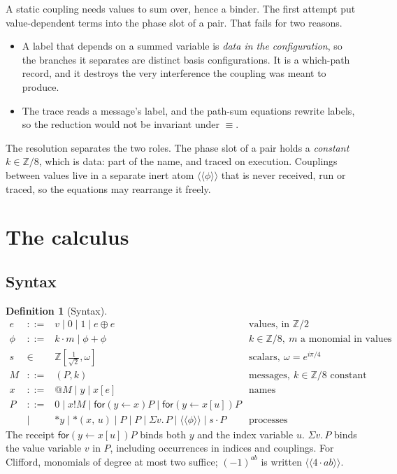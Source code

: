 \documentclass[11pt,a4paper]{article}
\theoremstyle{plain}
\theoremstyle{definition}
\newtheorem{definition}[theorem]{Definition}
\theoremstyle{remark}
\newcommand{\cpl}[1]{\langle\!\langle #1 \rangle\!\rangle}
\newcommand{\Zt}{\mathbb{Z}/2}
\newcommand{\Ze}{\mathbb{Z}/8}
\newcommand{\Sc}{\mathbb{Z}[\tfrac{1}{\sqrt2},\omega]}
\newcommand{\rcv}[3]{\mathsf{for}(#1 \leftarrow #2)#3}
\newcommand{\drop}[1]{{*}#1}
\newcommand{\bdrop}[2]{{*}(#1,\,#2)}
\newcommand{\Sig}[2]{\Sigma #1.\,#2}
\newcommand{\scong}{\equiv}
\begin{document}
A static coupling needs values to sum over, hence a binder. The first attempt
put value-dependent terms into the phase slot of a pair. That fails for two
reasons.
\begin{itemize}[leftmargin=1.5em]
\item A label that depends on a summed variable is \emph{data in the
  configuration}, so the branches it separates are distinct basis
  configurations. It is a which-path record, and it destroys the very
  interference the coupling was meant to produce.
\item The trace reads a message's label, and the path-sum equations rewrite
  labels, so the reduction would not be invariant under $\scong$.
\end{itemize}
The resolution separates the two roles. The phase slot of a pair holds a
\emph{constant} $k\in\Ze$, which is data: part of the name, and traced on
execution. Couplings between values live in a separate inert atom
$\cpl{\phi}$ that is never received, run or traced, so the equations may
rearrange it freely.

\section{The calculus}\label{sec:calculus}

\subsection{Syntax}

\begin{definition}[Syntax]\label{def:syntax}
\[
\begin{array}{rcll}
e & ::= & v \mid 0 \mid 1 \mid e\oplus e & \text{values, in } \Zt\\[2pt]
\phi & ::= & k\cdot m \mid \phi+\phi & k\in\Ze,\ m \text{ a monomial in values}\\[2pt]
s & \in & \Sc & \text{scalars}, \ \omega=e^{i\pi/4}\\[2pt]
M & ::= & (P,k) & \text{messages}, \ k\in\Ze \text{ constant}\\[2pt]
x & ::= & @M \mid y \mid x[e] & \text{names}\\[2pt]
P & ::= & 0 \mid x!M \mid \rcv{y}{x}{P} \mid \rcv{y}{x[u]}{P} & \\
  & \mid & \drop{y} \mid \bdrop{x}{u} \mid P \mid P
        \mid \Sig{v}{P} \mid \cpl{\phi} \mid s\cdot P & \text{processes}
\end{array}
\]
The receipt $\rcv{y}{x[u]}{P}$ binds both $y$ and the index variable $u$.
$\Sig{v}{P}$ binds the value variable $v$ in $P$, including occurrences in
indices and couplings. For Clifford, monomials of degree at most two suffice;
$(-1)^{ab}$ is written $\cpl{4\cdot ab}$.
\end{definition}
\end{document}
